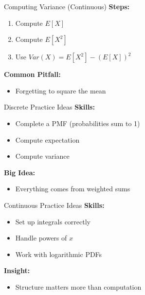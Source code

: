 \documentclass[dvipsnames]{beamer}
\begin{document}

\begin{frame}{Computing Variance (Continuous)}
\textbf{Steps:}
\begin{enumerate}
    \item Compute $E[X]$
    \item Compute $E[X^2]$
    \item Use $Var(X) = E[X^2] - (E[X])^2$
\end{enumerate}

\textbf{Common Pitfall:}
\begin{itemize}
    \item Forgetting to square the mean
\end{itemize}
\end{frame}


\begin{frame}{Discrete Practice Ideas}
\textbf{Skills:}
\begin{itemize}
    \item Complete a PMF (probabilities sum to 1)
    \item Compute expectation
    \item Compute variance
\end{itemize}

\textbf{Big Idea:}
\begin{itemize}
    \item Everything comes from weighted sums
\end{itemize}
\end{frame}


\begin{frame}{Continuous Practice Ideas}
\textbf{Skills:}
\begin{itemize}
    \item Set up integrals correctly
    \item Handle powers of $x$
    \item Work with logarithmic PDFs
\end{itemize}

\textbf{Insight:}
\begin{itemize}
    \item Structure matters more than computation
\end{itemize}
\end{frame}
\end{document}
